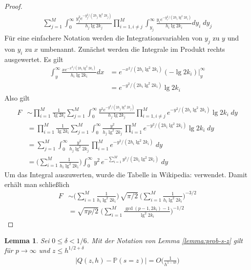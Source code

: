 \documentclass[a4paper, 11pt, ngerman]{article}
\renewcommand{\P}{\mathbb{P}}
\theoremstyle{definition}
\theoremstyle{plain}
\newtheorem{lemma}{Lemma}
\theoremstyle{remark}
\begin{document}
\begin{proof}
\begin{align*}
        \sum_{j = 1}^M \int_0^\infty
        \frac {y_j^2 e^{-y_j^2 / (2h_j \lg^2 2k_j)}} {h_j \lg 2k_j}
        \prod_{i = 1, i \ne j}^M \int_{y_j}^{\infty}
        \frac {y_i e^{-y_i^2 / (2h_i \lg^2 2k_i)}} {h_i \lg 2k_i} dy_i \; dy_j
    \end{align*}
    Für eine einfachere Notation werden die Integrationsvariablen von $y_j$ zu $y$ und von $y_i$ zu $x$ umbenannt. Zunächst werden die Integrale im Produkt rechts ausgewertet. Es gilt
    \begin{align*}
        \int_{y}^{\infty}
        \frac {x e^{-x^2 / (2h_i \lg^2 2k_i)}} {h_i \lg 2k_i} dx
         & = e^{-x^2/(2h_i \lg^2 2k_i)} (- \lg 2k_i) \Big \vert_{y}^{\infty} \\
         & = e^{-y^2/(2h_i \lg^2 2k_i)} \lg 2k_i
    \end{align*}
    Also gilt
    \begin{align*}
        F & \sim
        \prod_{i = 1}^M \frac 1 {\lg 2k_i}
        \sum_{j = 1}^M \int_0^\infty
        \frac {y^2 e^{-y^2 / (2h_j \lg^2 2k_j)}} {h_j \lg 2k_j}
        \prod_{i = 1, i \ne j}^M e^{-y^2/(2h_i \lg^2 2k_i)} \lg 2k_i \; dy \\
          & = \prod_{i = 1}^M \frac 1 {\lg 2k_i}
        \sum_{j = 1}^M \int_0^\infty
        \frac {y^2} {h_j \lg^2 2k_j} \,
        \prod_{i = 1}^M e^{-y^2/(2h_i \lg^2 2k_i)} \lg 2k_i \; dy          \\
          & = \sum_{j = 1}^M \int_0^\infty
        \frac {y^2} {h_j \lg^2 2k_j} \,
        \prod_{i = 1}^M e^{-y^2/(2h_i \lg^2 2k_i)} \; dy                   \\
          & = \Bigg ( \sum_{i = 1}^M \frac 1 {h_i \lg^2 2k_i} \Bigg )
        \int_0^\infty
        y^2 \,e^{- \sum_{i = 1}^M y^2/(2h_i \lg^2 2k_i)} \; dy
    \end{align*}
    Um das Integral auszuwerten, wurde die Tabelle in Wikipedia: \cite{gint} verwendet. Damit erhält man schließlich
    \begin{align*}
        F & \sim \Bigg (\sum_{i = 1}^M \frac 1 {h_i \lg^2 2k_i} \Bigg ) \,
        \sqrt {\pi / 2} \
        \Bigg ( \sum_{i = 1}^M \frac 1 {h_i \lg^2 2k_i} \Bigg )^{-3/2}     \\
          & = \sqrt{\pi p / 2} \; \Bigg (
        \sum_{i = 1}^M \frac {\gcd(p - 1, 2k_i) - 1} {\lg^2 2k_i} \Bigg )^{-1/2}
    \end{align*}
\end{proof}

\begin{lemma}
    Sei $0 \le \delta < 1/6$. Mit der Notation von Lemma \ref{lemma:prob-s-z} gilt für $p \to \infty$ und $z \le h^{1/2 + \delta}$
    \begin{align*}
        |Q(z, h) - \P(s = z)| = O \bigg ( \frac 1 {h^{1 - 4\delta}} \bigg )
    \end{align*}

    \label{lemma:prob-s-z-asmyp}
\end{lemma}
\end{document}
